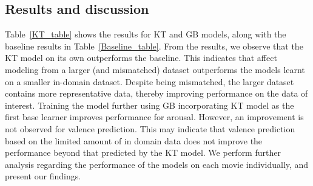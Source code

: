 \documentclass{article}
\begin{document}
\begin{spacing}{0.9}
\vspace{-2mm}
\section{Results and discussion}
\vspace{-2mm}
\label{sec:res}
Table~\ref{KT_table} shows the results for KT and GB models, along with the baseline results in Table~\ref{Baseline_table}.
From the results, we observe that the KT model on its own outperforms the baseline.
This indicates that affect modeling from a larger (and mismatched) dataset outperforms the models learnt on a smaller in-domain dataset.
Despite being mismatched, the larger dataset contains more representative data, thereby improving performance on the data of interest. 
Training the model further using GB incorporating KT model as the first base learner improves performance for arousal. 
However, an improvement is not observed for valence prediction.
This may indicate that valence prediction based on the limited amount of in domain data does not improve the performance beyond that predicted by the KT model.
We perform further analysis regarding the performance of the models on each movie individually, and present our findings. 



\end{spacing}
\end{document}
